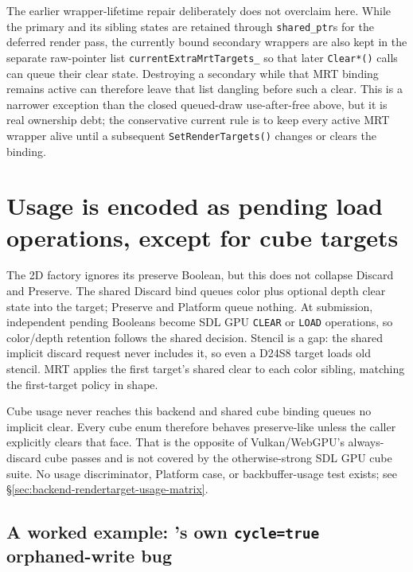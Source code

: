 The earlier wrapper-lifetime repair deliberately does not overclaim here. While the primary and
its sibling states are retained through \texttt{shared\_ptr}s for the deferred render pass, the
currently bound secondary wrappers are also kept in the separate raw-pointer list
\texttt{currentExtraMrt\allowbreak{}Targets\_} so that later \texttt{Clear\allowbreak{}*()} calls can queue
their clear state. Destroying a secondary  while that MRT binding remains active can
therefore leave that list dangling before such a clear. This is a narrower exception than the
closed queued-draw use-after-free above, but it is real ownership debt; the conservative current
rule is to keep every active MRT wrapper alive until a subsequent \texttt{SetRender\allowbreak{}Targets()}
changes or clears the binding.

\section{Usage is encoded as pending load operations, except for cube targets}

The 2D factory ignores its preserve Boolean, but this does not collapse Discard and Preserve.
The shared Discard bind queues color plus optional depth clear state into the target; Preserve
and Platform queue nothing. At submission, independent pending Booleans become SDL GPU
\texttt{CLEAR} or \texttt{LOAD} operations, so color/depth retention follows the shared
decision. Stencil is a gap: the shared implicit discard request never includes it, so even a
D24S8 target loads old stencil. MRT applies the first target's shared clear to each color
sibling, matching the first-target policy in shape.

Cube usage never reaches this backend and shared cube binding queues no implicit clear.
Every cube enum therefore behaves preserve-like unless the caller explicitly clears that
face. That is the opposite of Vulkan/WebGPU's always-discard cube passes and is not covered by
the otherwise-strong SDL GPU cube suite. No usage discriminator, Platform case, or
backbuffer-usage test exists; see \S\ref{sec:backend-rendertarget-usage-matrix}.

\subsection{A worked example: 's own \texttt{cycle=true} orphaned-write bug}

